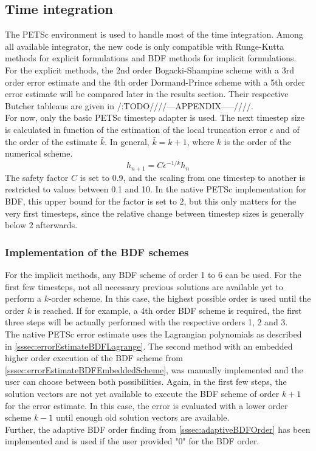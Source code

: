 \subsection{Time integration}
The PETSc environment is used to handle most of the time integration. Among all available integrator, the new code is only compatible with Runge-Kutta methods for explicit formulations and BDF methods for implicit formulations. \\
For the explicit methods, the 2nd order Bogacki-Shampine scheme with a 3rd order error estimate and the 4th order Dormand-Prince scheme with a 5th order error estimate will be compared later in the results section. Their respective Butcher tableaus are given in /:TODO////---APPENDIX-----////. \\
For now, only the basic PETSc timestep adapter is used. The next timestep size is calculated in function of the estimation of the local truncation error $\epsilon$ and of the order of the estimate $\bar{k}$. In general, $\bar{k}=k+1$, where $k$ is the order of the numerical scheme. 
\begin{equation}
	h_{n+1} = C\epsilon^{-1/\bar{k}}h_n
\end{equation}
The safety factor $C$ is set to 0.9, and the scaling from one timestep to another is restricted to values between 0.1 and 10. In the native PETSc implementation for BDF, this upper bound for the factor is set to 2, but this only matters for the very first timesteps, since the relative change between timestep sizes is generally below 2 afterwards.

\subsubsection{Implementation of the BDF schemes}
For the implicit methods, any BDF scheme of order 1 to 6 can be used. For the first few timesteps, not all necessary previous solutions are available yet to perform a $k$-order scheme. In this case, the highest possible order is used until the order $k$ is reached. If for example, a 4th order BDF scheme is required, the first three steps will be actually performed with the respective orders 1, 2 and 3. \\
The native PETSc error estimate uses the Lagrangian polynomials as described in \autoref{sssec:errorEstimateBDFLagrange}. The second method with an embedded higher order execution of the BDF scheme from \autoref{sssec:errorEstimateBDFEmbeddedScheme}, was manually implemented and the user can choose between both possibilities. Again, in the first few steps, the solution vectors are not yet available to execute the BDF scheme of order $k+1$ for the error estimate. In this case, the error is evaluated with a lower order scheme $k-1$ until enough old solution vectors are available. \\
Further, the adaptive BDF order finding from \autoref{sssec:adaptiveBDFOrder} has been implemented and is used if the user provided "0" for the BDF order. 

